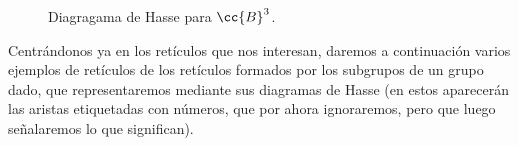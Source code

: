 \begin{ejemplo}
\begin{enumerate}
\begin{figure}[H]
                \caption{Diagragama de Hasse para $\cc{B}^3$.}
            \end{figure}
    \end{enumerate}
\end{ejemplo}

Centrándonos ya en los retículos que nos interesan, daremos a continuación varios ejemplos de retículos de los retículos formados por los subgrupos de un grupo dado, que representaremos mediante sus diagramas de Hasse (en estos aparecerán las aristas etiquetadas con números, que por ahora ignoraremos, pero que luego señalaremos lo que significan).

